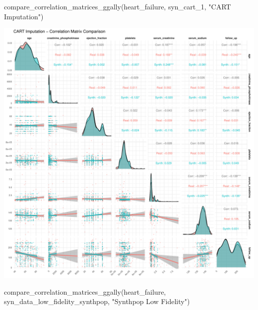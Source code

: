 \documentclass[
  letterpaper,
  DIV=11,
  numbers=noendperiod]{scrartcl}
\newenvironment{Shaded}{\begin{snugshade}}{\end{snugshade}}
\newcommand{\FunctionTok}[1]{\textcolor[rgb]{0.28,0.35,0.67}{#1}}
\newcommand{\NormalTok}[1]{\textcolor[rgb]{0.00,0.23,0.31}{#1}}
\newcommand{\StringTok}[1]{\textcolor[rgb]{0.13,0.47,0.30}{#1}}
\begin{document}
\begin{Shaded}
\begin{Highlighting}[]
\FunctionTok{compare\_correlation\_matrices\_ggally}\NormalTok{(heart\_failure, syn\_cart\_1, }\StringTok{"CART Imputation"}\NormalTok{)}
\end{Highlighting}
\end{Shaded}

\begin{center}
\includegraphics[width=1\linewidth,height=\textheight,keepaspectratio]{heart_failure_synthetic_data_project_files/figure-pdf/Correlation Matrices Comparison using GGally-2.pdf}
\end{center}

\begin{Shaded}
\begin{Highlighting}[]
\FunctionTok{compare\_correlation\_matrices\_ggally}\NormalTok{(heart\_failure, syn\_data\_low\_fidelity\_synthpop, }\StringTok{"Synthpop Low Fidelity"}\NormalTok{)}
\end{Highlighting}
\end{Shaded}
\end{document}
